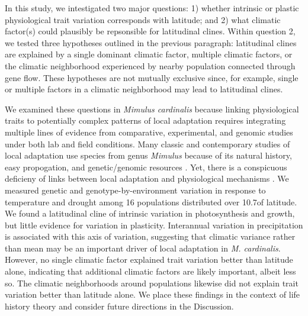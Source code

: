 \documentclass[11pt, oneside]{article}
\begin{document}

In this study, we intestigated two major questions: 1) whether intrinsic or plastic physiological trait variation corresponds with latitude; and 2) what climatic factor(s) could plausibly be repsonsible for latitudinal clines. Within question 2, we tested three hypotheses outlined in the previous paragraph: latitudinal clines are explained by a single dominant climatic factor, multiple climatic factors, or the climatic neighborhood experienced by nearby population connected through gene flow. These hypotheses are not mutually exclusive since, for example, single or multiple factors in a climatic neighborhood may lead to latitudinal clines.

We examined these questions in \textit{Mimulus cardinalis} because linking physiological traits to potentially complex patterns of local adaptation requires integrating multiple lines of evidence from comparative, experimental, and genomic studies under both lab and field conditions. Many classic and contemporary studies of local adaptation use species from genus \textit{Mimulus} because of its natural history, easy propogation, and genetic/genomic resources \citep{Clausen_etal_1940, Hiesey_etal_1971, Bradshaw_Schemske_2003, Wu_etal_2008, Lowry_Willis_2010, Wright_etal_2013}. Yet, there is a conspicuous deficieny of links between local adaptation and physiological mechanisms \citep{Angert_2006, Angert_etal_2008, Wu_etal_2010}. We measured genetic and genotype-by-environment variation in response to temperature and drought among 16 populations distributed over 10.7\textdegree of latitude. We found a latitudinal cline of intrinsic variation in photosynthesis and growth, but little evidence for variation in plasticity. Interannual variation in precipitation is associated with this axis of variation, suggesting that climatic variance rather than mean may be an important driver of local adaptation in \textit{M. cardinalis}. However, no single climatic factor explained trait variation better than latitude alone, indicating that additional climatic factors are likely important, albeit less so. The climatic neighborhoods around populations likewise did not explain trait variation better than latitude alone. We place these findings in the context of life history theory and consider future directions in the Discussion. 
\end{document}
